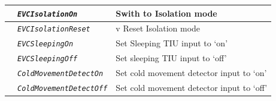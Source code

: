 \documentclass{template/openetcs}
\begin{document}
\begin{itemize}
\begin{longtable}{|l|l|l|}
			\hline
			
			&	\begin{minipage}[t]{0.40\linewidth} \emph{\texttt{EVCIsolationOn}} \end{minipage}
			&	\begin{minipage}[t]{0.38\linewidth} Swith to Isolation mode \end{minipage} \\
			
			\hline
			
			&	\begin{minipage}[t]{0.40\linewidth} \emph{\texttt{EVCIsolationReset}} \end{minipage}
			&	\begin{minipage}[t]{0.38\linewidth}v Reset Isolation mode \end{minipage} \\
			
			\hline
			
			&	\begin{minipage}[t]{0.40\linewidth} \emph{\texttt{EVCSleepingOn}} \end{minipage}
			&	\begin{minipage}[t]{0.38\linewidth} Set Sleeping TIU input to ‘on’ \end{minipage} \\
			
			\hline
			
			&	\begin{minipage}[t]{0.40\linewidth} \emph{\texttt{EVCSleepingOff}} \end{minipage}
			&	\begin{minipage}[t]{0.38\linewidth} Set sleeping TIU input to ‘off’\end{minipage} \\
			
			\hline
			
			&	\begin{minipage}[t]{0.40\linewidth} \emph{\texttt{ColdMovementDetectOn}} \end{minipage}
			&	\begin{minipage}[t]{0.38\linewidth} Set cold movement detector input to ‘on’ \end{minipage} \\
			
			\hline
			
			&	\begin{minipage}[t]{0.40\linewidth} \emph{\texttt{ColdMovementDetectOff}} \end{minipage}
			&	\begin{minipage}[t]{0.38\linewidth} Set cold movement detector input to ‘off’ \end{minipage} \\
			

\end{longtable}
\end{itemize}
\end{document}
